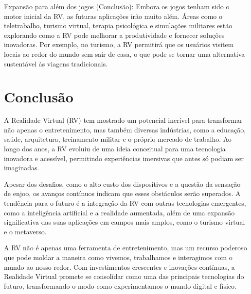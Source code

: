 \documentclass[article,a4paper,12pt,brazil,sumario=tradicional]{abntex2}
\begin{document}
Expansão para além dos jogos (Conclusão): Embora os jogos tenham sido o motor inicial da RV, as futuras aplicações irão muito além. Áreas como o teletrabalho, turismo virtual, terapia psicológica e simulações militares estão explorando como a RV pode melhorar a produtividade e fornecer soluções inovadoras. Por exemplo, no turismo, a RV permitirá que os usuários visitem locais ao redor do mundo sem sair de casa, o que pode se tornar uma alternativa sustentável às viagens tradicionais.

\section{Conclusão}

A Realidade Virtual (RV) tem mostrado um potencial incrível para transformar não apenas o entretenimento, mas também diversas indústrias, como a educação, saúde, arquitetura, treinamento militar e o próprio mercado de trabalho. Ao longo dos anos, a RV evoluiu de uma ideia conceitual para uma tecnologia inovadora e acessível, permitindo experiências imersivas que antes só podiam ser imaginadas. 

Apesar dos desafios, como o alto custo dos dispositivos e a questão da sensação de enjoo, os avanços contínuos indicam que esses obstáculos serão superados. A tendência para o futuro é a integração da RV com outras tecnologias emergentes, como a inteligência artificial e a realidade aumentada, além de uma expansão significativa das suas aplicações em campos mais amplos, como o turismo virtual e o metaverso.

A RV não é apenas uma ferramenta de entretenimento, mas um recurso poderoso que pode moldar a maneira como vivemos, trabalhamos e interagimos com o mundo ao nosso redor. Com investimentos crescentes e inovações contínuas, a Realidade Virtual promete se consolidar como uma das principais tecnologias do futuro, transformando o modo como experimentamos o mundo digital e físico.
\end{document}
